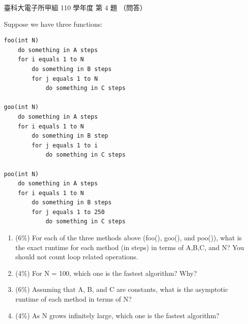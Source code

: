 \begin{pastexam}[label={px:ntust-110-ete-ds-04}]{臺科大電子所甲組 110 學年度 第 4 題}
（問答）

Suppose we have three functions:
\begin{verbatim}
foo(int N)
    do something in A steps
    for i equals 1 to N
        do something in B steps
        for j equals 1 to N
            do something in C steps

goo(int N)
    do something in A steps
    for i equals 1 to N
        do something in B step
        for j equals 1 to i
            do something in C steps

poo(int N)
    do something in A steps
    for i equals 1 to N
        do something in B steps
        for j equals 1 to 250
            do something in C steps
\end{verbatim}
\begin{enumerate}[label=(\alph*)]
\item (6\%) For each of the three methods above (foo(), goo(), and poo()), what is the exact
runtime for each method (in steps) in terms of A,B,C, and N? You should not count loop related
operations.
\item (4\%) For N = 100, which one is the fastest algorithm? Why?
\item (6\%) Assuming that A, B, and C are constants, what is the asymptotic runtime of each method
in terms of N?
\item (4\%) As N grows infinitely large, which one is the fastest algorithm?
\end{enumerate}
\end{pastexam}

